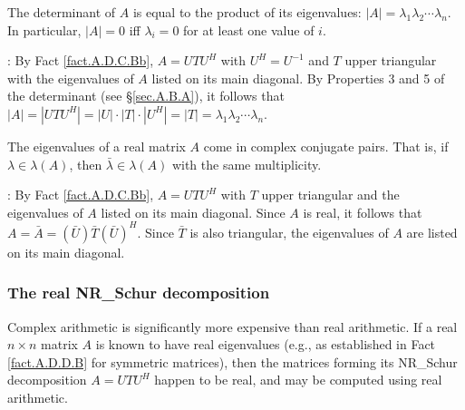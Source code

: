 \begin{fact} \label{fact.A.D.C.Be} The determinant of $A$ is equal to the product of its eigenvalues:
$|A|=\lambda_{1}\lambda_{2}\cdots\lambda_{n}$.  In particular, $|A|=0$
iff $\lambda_{i}=0$ for at least one value of $i$.
\end{fact}

\/: By Fact \ref{fact.A.D.C.Bb}, $A=UTU^{H}$ with
$U^{H}=U^{-1}$ and $T$ upper triangular with the eigenvalues of $A$
listed on its main diagonal.  By Properties 3 and 5 of the determinant
(see \S \ref{sec.A.B.A}), it follows that $|A|=|UTU^{H}|=|U|\cdot
|T|\cdot |U^{H}|= |T| =
\lambda_{1}\lambda_{2}\cdots\lambda_{n}$.  \endproof \vskip0.1in

\begin{fact} \label{fact.A.D.C.Bf} The eigenvalues of a real matrix $A$ come in complex conjugate pairs.
That is, if $\lambda\in \lambda(A)$, then $\bar\lambda \in \lambda(A)$ with the same multiplicity.
\end{fact}

\/: By Fact \ref{fact.A.D.C.Bb}, $A=UTU^{H}$ with $T$ upper triangular and the eigenvalues of $A$
listed on its main diagonal.  Since $A$ is real, it follows that $A=\bar A=(\bar U) \bar T (\bar U)^{H}$.  Since $\bar T$ is also triangular,
the eigenvalues of $A$ are listed on its main diagonal.  \endproof

\subsubsection{The real NR_Schur decomposition} \label{sec.A.D.Ca}

Complex arithmetic is significantly more expensive than real arithmetic.  If a real $n\times n$ matrix $A$ is known
to have real eigenvalues (e.g., as established in Fact \ref{fact.A.D.D.B} for symmetric matrices), then the matrices forming its
NR_Schur decomposition $A=UTU^H$ happen to be real, and may be computed using real arithmetic.  

